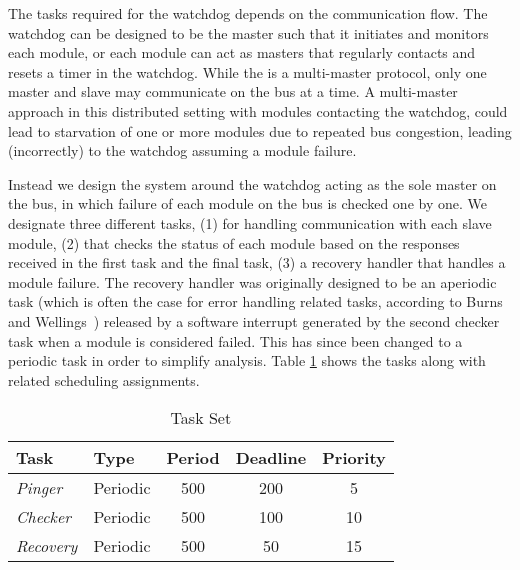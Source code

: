 The tasks required for the watchdog depends on the communication flow. The watchdog can be designed to be the master such that it initiates and monitors each module, or each module can act as masters that regularly contacts and resets a timer in the watchdog. While the \iic is a multi-master protocol, only one master and slave may communicate on the bus at a time.
A multi-master approach in this distributed setting with modules contacting the watchdog, could lead to starvation of one or more modules due to repeated bus congestion, leading (incorrectly) to the watchdog assuming a module failure.

Instead we design the system around the watchdog acting as the sole master on the bus, in which failure of each module on the bus is checked one by one. We designate three different tasks, (1) for handling \iic communication with each slave module, (2) that checks the status of each module based on the responses received in the first task and the final task, (3) a recovery handler that handles a module failure. The recovery handler was originally designed to be an aperiodic task (which is often the case for error handling related tasks, according to Burns and Wellings~\cite{alan2001real}) released by a software interrupt generated by the second checker task when a module is considered failed. This has since been changed to a periodic task in order to simplify analysis. Table \ref{tab:taskslol} shows the tasks along with related scheduling assignments.
\begin{table}
\centering
\begin{tabular}{ | l | l | c | c | c |}
\hline
Task & Type & Period & Deadline & Priority  \\ \hline
\textit{Pinger} & Periodic & 500 & 200 & 5  \\ \hline
\textit{Checker} & Periodic & 500 & 100 & 10 \\ \hline
\textit{Recovery} & Periodic & 500 & 50 &  15 \\
\hline
\end{tabular}
 \caption{Task Set}
 \label{tab:taskslol}
\end{table}

